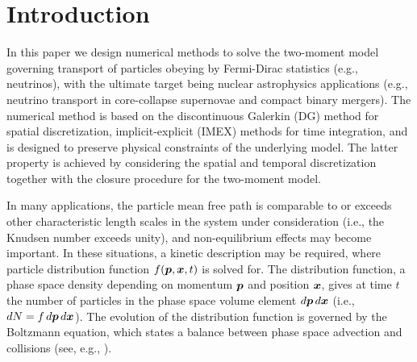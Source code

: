 \section{Introduction}
\label{sec:intro}

In this paper we design numerical methods to solve the two-moment model governing transport of particles obeying by Fermi-Dirac statistics (e.g., neutrinos), with the ultimate target being nuclear astrophysics applications (e.g., neutrino transport in core-collapse supernovae and compact binary mergers).  
The numerical method is based on the discontinuous Galerkin (DG) method for spatial discretization, implicit-explicit (IMEX) methods for time integration, and is designed to preserve physical constraints of the underlying model.  
The latter property is achieved by considering the spatial and temporal discretization together with the closure procedure for the two-moment model.  

In many applications, the particle mean free path is comparable to or exceeds other characteristic length scales in the system under consideration (i.e., the Knudsen number exceeds unity), and non-equilibrium effects may become important.  
In these situations, a kinetic description may be required, where particle distribution function $f(\boldsymbol{p},\boldsymbol{x},t)$ is solved for.  
The distribution function, a phase space density depending on momentum $\boldsymbol{p}$ and position $\boldsymbol{x}$, gives at time $t$ the number of particles in the phase space volume element $d\boldsymbol{p}\,d\boldsymbol{x}$ (i.e., $dN=f\,d\boldsymbol{p}\,d\boldsymbol{x}$).  
The evolution of the distribution function is governed by the Boltzmann equation, which states a balance between phase space advection and collisions (see, e.g., \cite{braginskii_1965,chapmanCowling_1970,lifshitzPitaevskii_1981}).  

